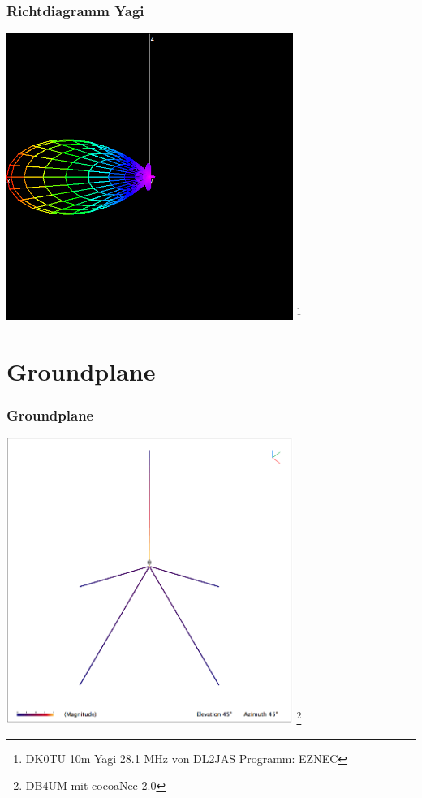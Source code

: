 \begin{frame}
    \frametitle{Richtdiagramm Yagi}
    \begin{center}
        \includegraphics[width=0.7\textwidth]{e11/yagi_gain.png}
        \footnote{\tiny DK0TU 10m Yagi 28.1 MHz von DL2JAS Programm: EZNEC}
	\end{center}
\end{frame}

\section*{Groundplane}

\begin{frame}
    \frametitle{Groundplane}
    \begin{center}
        \includegraphics[width=0.7\textwidth]{e11/GP-DB4UM.png}
        \footnote{\tiny DB4UM mit cocoaNec 2.0}
	\end{center}
\end{frame}

